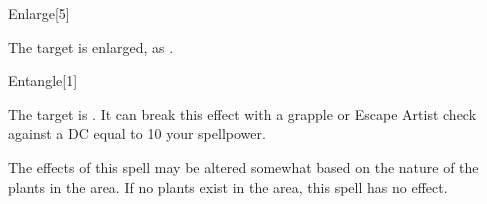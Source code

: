 \begin{spellsection}[Mass]{Enlarge}[5]
    \begin{spellheader}
    \end{spellheader}
    \begin{spellcontent}
        \begin{spelltargetinginfo}
        \end{spelltargetinginfo}
        \begin{spelleffects}
            \spelleffect The target is enlarged, as .
            \spelldur \durshort \dismissable
        \end{spelleffects}
    \end{spellcontent}
    \begin{spellfooter}
        \spellnotes \sizingspellnotes
        \miscastexplode
    \end{spellfooter}
\end{spellsection}

\begin{spellsection}{Entangle}[1]
    \begin{spellheader}
    \end{spellheader}
    \begin{spellcontent}
        \begin{spelltargetinginfo}
        \end{spelltargetinginfo}
        \begin{spelleffects}
            \spelleffect The target is \entangled.
            It can break this effect with a grapple or Escape Artist check against a DC equal to 10 \add your spellpower.
            \spelldur \durbrief
        \end{spelleffects}
    \end{spellcontent}
    \begin{spellfooter}
        \spellnotes The effects of this spell may be altered somewhat based on the nature of the plants in the area. If no plants exist in the area, this spell has no effect.
        \miscastrandom
    \end{spellfooter}
\end{spellsection}

